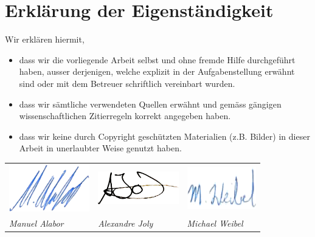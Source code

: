 \chapter*{Erklärung der Eigenständigkeit}

Wir erklären hiermit,

\begin{itemize}
	\item dass wir die vorliegende Arbeit selbst und ohne fremde Hilfe durchgeführt haben, ausser derjenigen, welche explizit in der Aufgabenstellung erwähnt sind oder mit dem Betreuer schriftlich vereinbart wurden.
	\item dass wir sämtliche verwendeten Quellen erwähnt und gemäss gängigen wissenschaftlichen Zitierregeln korrekt angegeben haben.
	\item dass wir keine durch Copyright geschützten Materialien (z.B. Bilder) in dieser Arbeit in unerlaubter Weise genutzt haben.
\end{itemize}


\vspace*{3cm}

\begin{table}[H]
\begin{tabularx}{\textwidth}{X X X}
	\includegraphics[width=3.5cm]{content/images/signature-mal.png} &
	\centering\includegraphics[width=3.5cm]{content/images/signature-ajo.png} &
	\hfill\includegraphics[width=3cm]{content/images/signature-mwe.png}

	\tabularnewline

	\sffamily\textit{Manuel Alabor} &
	\centering\sffamily\textit{Alexandre Joly} &
	\hfill\sffamily\textit{Michael Weibel}
	\tabularnewline
\end{tabularx}
\end{table}